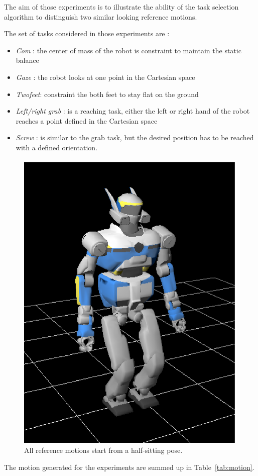 \documentclass[letterpaper, 10pt, conference]{ieeeconf}      %
\begin{document}
The aim of those experiments is to illustrate the ability of the
task selection algorithm to distinguish two similar looking reference motions.

The set of tasks considered in those experiments are :

\begin{itemize}
  \item \emph{Com} : the center of mass of the robot is constraint to maintain the static balance
  \item \emph{Gaze} : the robot looks at one point in the Cartesian space
  \item \emph{Twofeet}: constraint the both feet to stay flat on the ground
  \item \emph{Left/right grab} : is a reaching task, either the left or right hand
of the robot reaches a point defined in the Cartesian space
\item \emph{Screw} : is similar to the grab task, but the desired position
has to be reached with a defined orientation.
\end{itemize}
\begin{figure}[t]
\begin{center}
\includegraphics[width=0.3\linewidth]{img/halfSit.ps}
\end{center}
\caption{All reference motions start from a half-sitting pose.}
\label{fig:halfSit}
\end{figure}

The motion generated for the experiments are summed up in Table~\ref{tab:motion}.
\end{document}
